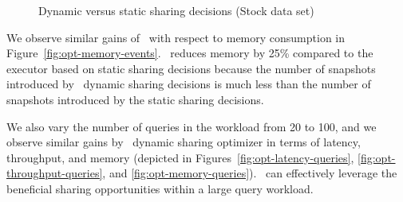 
\begin{figure}[!htb]
\vspace{-10pt}
	\centering
\vspace{-10pt}
    \caption{Dynamic versus static sharing decisions (Stock data set)}
    \label{fig:opt-memory}
\vspace{-5pt}
\end{figure}

We observe similar gains of \app\ with respect to memory consumption in Figure~\ref{fig:opt-memory-events}. \app\ reduces memory by 25\% compared to the executor based on static sharing decisions because the number of snapshots introduced by \app\ dynamic sharing decisions is much less than the number of snapshots introduced by the static sharing decisions. 


We also vary the number of queries in the workload from 20 to 100, and we observe similar gains by \app\ dynamic sharing optimizer in terms of latency, throughput, and memory (depicted in Figures~\ref{fig:opt-latency-queries}, \ref{fig:opt-throughput-queries}, and \ref{fig:opt-memory-queries}). \app\ can effectively leverage the beneficial sharing opportunities within a large query workload.

